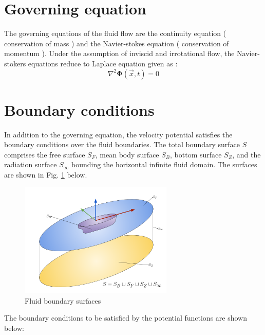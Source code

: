 \section{Governing equation}
The governing equations of the fluid flow are the continuity equation ( conservation of mass ) 
and the Navier-stokes equation ( conservation of momentum ). Under the assumption of inviscid 
and irrotational flow, the Navier-stokers equations reduce to Laplace equation given as :
\begin{equation}
    \label{eq:laplace_eq}
    \nabla^2 \boldsymbol{\Phi} (\vec{x}, t) = 0
\end{equation}

\section{Boundary conditions}
\label{sec:Boundary condition}
In addition to the governing equation, the velocity potential satisfies the boundary 
conditions over the fluid boundaries. The total boundary surface $S$ comprises the 
free surface $S_F$, mean body surface $S_B$, bottom surface $S_Z$, and the radiation surface
 $S_\infty$ bounding the horizontal infinite fluid domain. The surfaces are shown in 
 Fig. \ref{fig:boundary_surfaces} below.
\begin{figure}[H]
	\centering
	\includegraphics[width = 0.65\textwidth]{photos/boundary_surfaces.png}
	\caption{Fluid boundary surfaces}
	\label{fig:boundary_surfaces}
\end{figure}
The boundary conditions to be satisfied by the potential functions are shown below:

